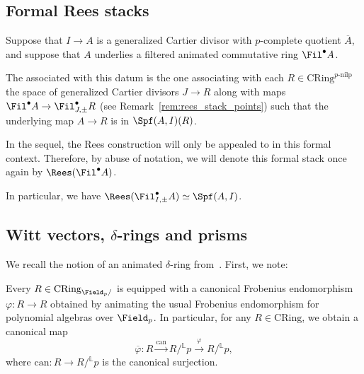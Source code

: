 \documentclass[10pt]{amsart}
\begin{document}
\subsection{Formal Rees stacks}
\label{subsec:formal_rees}

Suppose that $I\to A$ is a generalized Cartier divisor with $p$-complete quotient $\overline{A}$, and suppose that $A$ underlies a filtered animated commutative ring $\Fil^\bullet A$. 


\begin{definition}
The  associated with this datum is the one associating with each $R\in \mathrm{CRing}^{p\text{-nilp}}$ the space of generalized Cartier divisors $J\to R$ along with maps $\Fil^\bullet A\to \Fil^\bullet_{J,\pm}R$ (see Remark~\ref{rem:rees_stack_points}) such that the underlying map $A\to R$ is in $\Spf(A,I)(R)$. 
\end{definition}


In the sequel, the Rees construction will only be appealed to in this formal context. Therefore, by abuse of notation, we will denote this formal stack once again by $\Rees(\Fil^\bullet A)$. 

In particular, we have $\Rees(\Fil^\bullet_{I,\pm}A) \simeq \Spf(A,I)$. 

\subsection{Witt vectors, $\delta$-rings and prisms}

We recall the notion of an animated $\delta$-ring from~\cite[App. A]{bhatt2022prismatization}. First, we note:

\begin{remark}
\label{rem:frobenius_mod_p}
Every $R\in \mathrm{CRing}_{\Field_p/}$ is equipped with a canonical Frobenius endomorphism $\varphi:R\to R$ obtained by animating the usual Frobenius endomorphism for polynomial algebras over $\Field_p$. In particular, for any $R\in \mathrm{CRing}$, we obtain a canonical map
\[
\overline{\varphi}:R\xrightarrow{\mathrm{can}}R/{}^{\mathbb{L}}p\xrightarrow{\varphi}R/{}^{\mathbb{L}}p,
\]
where $\mathrm{can}:R\to R/{}^{\mathbb{L}}p$ is the canonical surjection.
\end{remark}
\end{document}
